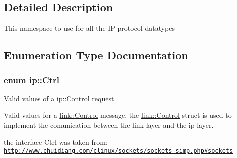 \subsection{Detailed Description}
This namespace to use for all the IP protocol datatypes 

\subsection{Enumeration Type Documentation}
\subsubsection[{\texorpdfstring{Ctrl}{Ctrl}}]{\setlength{\rightskip}{0pt plus 5cm}enum {\bf ip\+::\+Ctrl}}\hypertarget{namespaceip_a341d8827cf57ab044a78c05922bea473}{}\label{namespaceip_a341d8827cf57ab044a78c05922bea473}


Valid values of a \hyperlink{structip_1_1Control}{ip\+::\+Control} request. 

Valid values for a \hyperlink{structlink_1_1Control}{link\+::\+Control} message, the \hyperlink{structlink_1_1Control}{link\+::\+Control} struct is used to implement the comunication between the link layer and the ip layer.

the interface Ctrl was taken from\+: \href{http://www.chuidiang.com/clinux/sockets/sockets_simp.php#sockets}{\tt http\+://www.\+chuidiang.\+com/clinux/sockets/sockets\+\_\+simp.\+php\#sockets} 